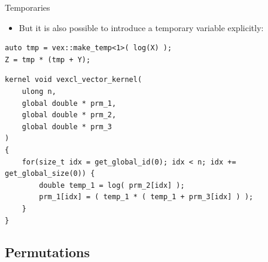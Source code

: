 \documentclass[@BEAMER_OPTIONS@]{beamer}
\begin{document}
\note{ }

\begin{frame}[fragile]{Temporaries}
    \begin{itemize}
        \item But it is also possible to introduce a temporary variable
            explicitly:
    \end{itemize}
    \begin{exampleblock}{}
        \begin{lstlisting}
auto tmp = vex::make_temp<1>( log(X) );
Z = tmp * (tmp + Y);
        \end{lstlisting}
    \end{exampleblock}
    \begin{exampleblock}{}
        \begin{lstlisting}
kernel void vexcl_vector_kernel(
    ulong n,
    global double * prm_1,
    global double * prm_2,
    global double * prm_3
)
{
    for(size_t idx = get_global_id(0); idx < n; idx += get_global_size(0)) {
        double temp_1 = log( prm_2[idx] );
        prm_1[idx] = ( temp_1 * ( temp_1 + prm_3[idx] ) );
    }
}
        \end{lstlisting}
    \end{exampleblock}
\end{frame}

\note{ }

\subsection{Permutations}
\end{document}
